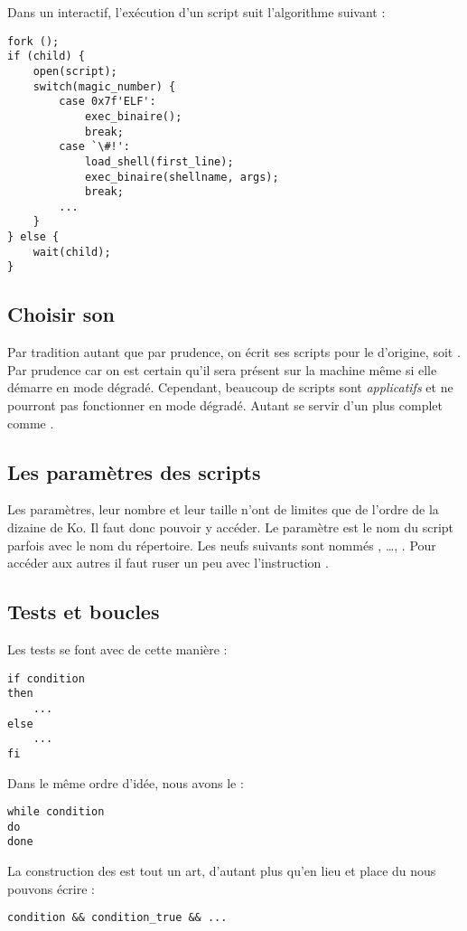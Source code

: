 Dans un \shell interactif, l'exécution d'un script suit l'algorithme suivant :

\begin{lstlisting}
fork ();
if (child) {
	open(script);
	switch(magic_number) {
		case 0x7f'ELF':
			exec_binaire();
			break;
		case `\#!':
			load_shell(first_line);
			exec_binaire(shellname, args);
			break;
		...
	}
} else {
	wait(child);
}
\end{lstlisting}

\subsection{Choisir son \shell}
Par tradition autant que par prudence, on écrit ses scripts \shell pour le \shell d'origine, soit \sh. Par prudence car on est certain qu'il sera présent sur la machine même si elle démarre en mode dégradé. Cependant, beaucoup de scripts sont \emph{applicatifs} et ne pourront pas fonctionner en mode dégradé. Autant se servir d'un \shell plus complet comme \bash.

\subsection{Les paramètres des scripts}

Les paramètres, leur nombre et leur taille n'ont de limites que de l'ordre de la dizaine de Ko. Il faut donc pouvoir y accéder. Le paramètre  est le nom du script parfois avec le nom du répertoire. Les neufs suivants sont nommés , \ldots, . Pour accéder aux autres il faut ruser un peu avec l'instruction .

\subsection{Tests et boucles}
Les tests se font avec  de cette manière :
\begin{lstlisting}
if condition
then
	...
else
	...
fi
\end{lstlisting}

Dans le même ordre d'idée, nous avons le  :
\begin{lstlisting}
while condition
do
done
\end{lstlisting}

La construction des  est tout un art, d'autant plus qu'en lieu et place du  nous pouvons écrire :
\begin{lstlisting}
condition && condition_true && ...
\end{lstlisting}

